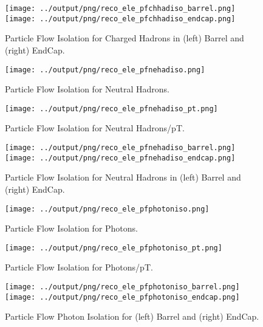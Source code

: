 \documentclass[11pt]{book}
\begin{document}
\begin{figure}[ht]
\centering
\texttt{[image: ../output/png/reco\_ele\_pfchhadiso\_barrel.png]}
\texttt{[image: ../output/png/reco\_ele\_pfchhadiso\_endcap.png]}
\caption{Particle Flow Isolation for Charged Hadrons in (left) Barrel and (right) EndCap.}
\label{fig:reco_ele_pfchhadiso_regions}
\end{figure}

\begin{figure}[ht]
\centering
\texttt{[image: ../output/png/reco\_ele\_pfnehadiso.png]}
\caption{Particle Flow Isolation for Neutral Hadrons.}
\label{fig:reco_ele_pfnehadiso}
\end{figure}

\begin{figure}[htb]
\centering
\texttt{[image: ../output/png/reco\_ele\_pfnehadiso\_pt.png]}
\caption{Particle Flow Isolation for Neutral Hadrons/pT.}
\label{fig:reco_ele_pfnehadiso_pt}
\end{figure}


\begin{figure}[ht]
\centering
\texttt{[image: ../output/png/reco\_ele\_pfnehadiso\_barrel.png]}
\texttt{[image: ../output/png/reco\_ele\_pfnehadiso\_endcap.png]}
\caption{Particle Flow Isolation for Neutral Hadrons in (left) Barrel and (right) EndCap.}
\label{fig:reco_ele_pfnehadiso_regions}
\end{figure}

\begin{figure}[ht]
\centering
\texttt{[image: ../output/png/reco\_ele\_pfphotoniso.png]}
\caption{Particle Flow Isolation for Photons.}
\label{fig:reco_ele_pfphotoniso}
\end{figure}

\begin{figure}[ht]
\centering
\texttt{[image: ../output/png/reco\_ele\_pfphotoniso\_pt.png]}
\caption{Particle Flow Isolation for Photons/pT.}
\label{fig:reco_ele_pfphotoniso_pt}
\end{figure}

\begin{figure}[ht]
\centering
\texttt{[image: ../output/png/reco\_ele\_pfphotoniso\_barrel.png]}
\texttt{[image: ../output/png/reco\_ele\_pfphotoniso\_endcap.png]}
\caption{Particle Flow Photon Isolation for (left) Barrel and (right) EndCap.}
\label{fig:reco_ele_pfphotoniso_regions}
\end{figure}
\end{document}
